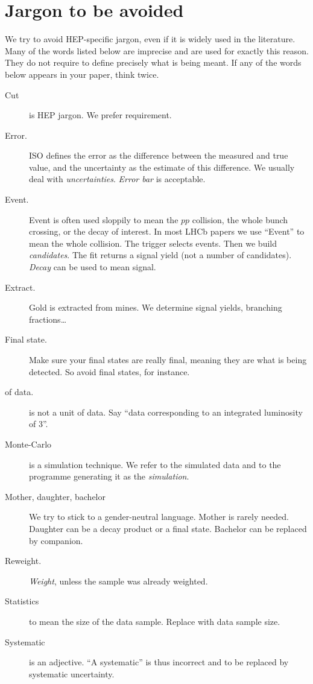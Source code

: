 \section{Jargon to be avoided}
\label{sec:jargon}
We try to avoid HEP-specific jargon, even if it is widely used in the literature. Many of the words listed below are imprecise and are used for exactly this reason. They do not require to define precisely what is being meant. If any of the words below appears in your paper,
think twice.
\begin{description}
\item[Cut] is HEP jargon. We prefer requirement. 
\item[Error.] ISO defines the error as the difference between the measured and true value, and the uncertainty as the estimate of this difference. We usually deal with {\it uncertainties}. {\it Error bar} is acceptable.
\item[Event.] Event is often used sloppily to mean the $pp$ collision, the whole bunch crossing, or the \B decay of interest. In most LHCb papers we use ``Event'' to mean the whole collision. The trigger selects events. Then we build {\it candidates}. The fit returns a signal yield (not a number of candidates). {\it Decay} can be used to mean signal.
\item[Extract.] Gold is extracted from mines. We determine signal yields, branching fractions\dots
\item[Final state.] Make sure your final states are really final, meaning they are what is being detected. So avoid \jpsi{}\Kp final states, for instance.
\item[\boldmath\invfb of data.] \invfb is not a unit of data. Say ``data corresponding to an integrated luminosity of 3\invfb''.
\item[Monte-Carlo] is a simulation technique. We refer to the simulated data and to the programme generating it as the {\it simulation}.  
\item[Mother, daughter, bachelor\etc] We try to stick to a gender-neutral language.  Mother is rarely needed. Daughter can be a decay product or a final state. Bachelor can be replaced by companion.
\item[Reweight.] {\it Weight}, unless the sample was already weighted.
\item[Statistics] to mean the size of the data sample. Replace with data sample size.
\item[Systematic] is an adjective. ``A systematic'' is thus incorrect and to be replaced by systematic uncertainty.
\end{description}

